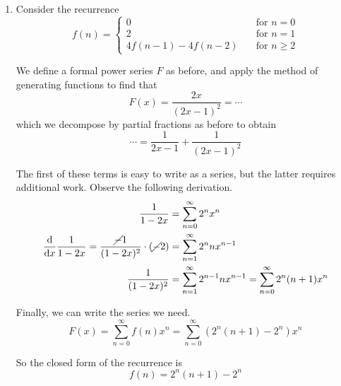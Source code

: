 \documentclass[11pt]{article}
\begin{document}
\begin{enumerate}
    \item
        Consider the recurrence
        \begin{equation*}
            f(n) = \begin{cases}
                0   &\quad\text{for } n = 0 \\
                2   &\quad\text{for } n = 1 \\
                4 f(n-1) - 4 f(n-2)
                    &\quad\text{for } n \geq 2
            \end{cases}
        \end{equation*}

        We define a formal power series $F$ as before, and apply the method of
        generating functions to find that
        \begin{equation*}
            F(x) = \frac{2x}{(2x - 1)^2} = \cdots
        \end{equation*}
        which we decompose by partial fractions as before to obtain
        \begin{equation*}
            \cdots = \frac{1}{2x - 1} + \frac{1}{(2x-1)^2}
        \end{equation*}

        The first of these terms is easy to write as a series, but the latter
        requires additional work. Observe the following derivation.
        \begin{align*}
            \frac{1}{1-2x} &= \sum_{n=0}^\infty 2^n x^n \\
            \frac{\mathrm{d} }{\mathrm{d} x} \frac{1}{1-2x}
                = \frac{\cancel{-}1}{(1-2x)^2} \cdot (\cancel{-} 2)
                &= \sum_{n=1}^\infty 2^n n x^{n-1} \\
            \frac{1}{(1-2x)^2} &=
                \sum_{n=1}^\infty 2^{n-1} n x^{n-1}
                =
                \sum_{n=0}^\infty 2^n (n+1) x^n
        \end{align*}

        Finally, we can write the series we need.
        \begin{equation*}
            F(x)
            = \sum_{n=0}^\infty f(n) x^n
            = \sum_{n=0}^\infty (2^n (n+1) - 2^n) x^n
        \end{equation*}

        So the closed form of the recurrence is
        \begin{equation*}
            f(n) = 2^n (n+1) - 2^n
        \end{equation*}
\end{enumerate}
\end{document}
